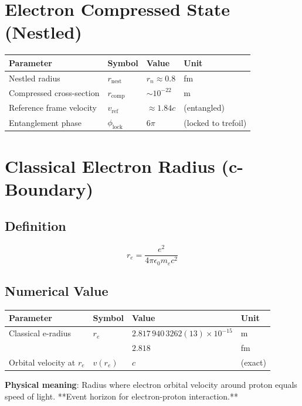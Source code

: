 \documentclass{article}
\begin{document}
\section{Electron Compressed State (Nestled)}

\begin{longtable}{llll}
\toprule
\textbf{Parameter} & \textbf{Symbol} & \textbf{Value} & \textbf{Unit} \\
\midrule
Nestled radius & $r_{\text{nest}}$ & $r_n \approx 0.8$ & fm \\
Compressed cross-section & $r_{\text{comp}}$ & $\sim 10^{-22}$ & m \\
Reference frame velocity & $v_{\text{ref}}$ & $\approx 1.84c$ & (entangled) \\
Entanglement phase & $\phi_{\text{lock}}$ & $6\pi$ & (locked to trefoil) \\
\bottomrule
\end{longtable}

\section{Classical Electron Radius (c-Boundary)}

\subsection{Definition}

\begin{equation}
r_e = \frac{e^2}{4\pi\epsilon_0 m_e c^2}
\end{equation}

\subsection{Numerical Value}

\begin{longtable}{llll}
\toprule
\textbf{Parameter} & \textbf{Symbol} & \textbf{Value} & \textbf{Unit} \\
\midrule
Classical e-radius & $r_e$ & $2.817\,940\,3262(13) \times 10^{-15}$ & m \\
& & $2.818$ & fm \\
Orbital velocity at $r_e$ & $v(r_e)$ & $c$ & (exact) \\
\bottomrule
\end{longtable}

\textbf{Physical meaning}: Radius where electron orbital velocity around proton equals speed of light. **Event horizon for electron-proton interaction.**
\end{document}

